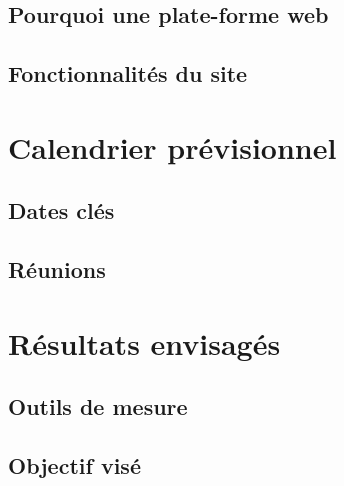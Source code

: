 \documentclass[a4paper, 12pt]{report}
\begin{document}
\section{Pourquoi une plate-forme web}
\section{Fonctionnalités du site}

\chapter{Calendrier prévisionnel}
\thispagestyle{fancy}
\section{Dates clés}
\section{Réunions}

\chapter{Résultats envisagés}
\thispagestyle{fancy}
\section{Outils de mesure}

\section{Objectif visé}

\newpage
\appendix
\chapter{}
\thispagestyle{fancy}
\end{document}
